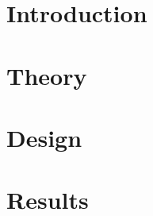
	\fontfamily{\sfdefault}\selectfont 
	\thispagestyle{nohdr}
	\null\pagebreak
	\tableofcontents
	\pagebreak
	\listoffigures
	\listoftables


	\fontfamily{\rmdefault}\selectfont 
	\pagebreak
	\FloatBarrier
	
	\FloatBarrier\pagebreak
	\null

	\pagebreak\FloatBarrier

	\section{Introduction}\label{intro}
	
	\pagebreak\FloatBarrier

	\section{Theory}\label{theory}
	
	\FloatBarrier\newpage
	\section{Design}\label{design}
	
	
	\FloatBarrier\pagebreak
	\section{Results}\label{results}
	

